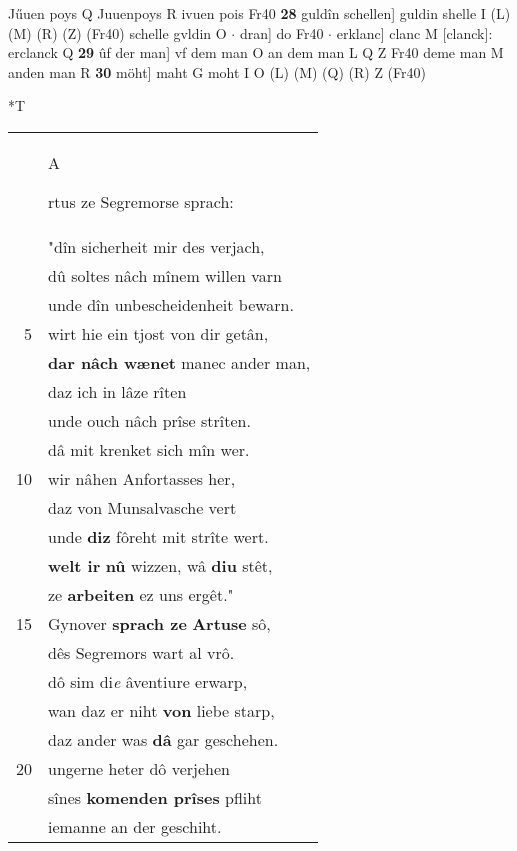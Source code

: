 \documentclass[8pt,a4paper,notitlepage]{article}
\begin{document}
\begin{table}[ht]
\begin{minipage}[t]{0.5\linewidth}
Jűuen poys Q Juuenpoys R ivuen pois Fr40 \textbf{28} guldîn schellen] guldin shelle I (L) (M) (R) (Z) (Fr40) schelle gvldin O  $\cdot$ dran] do Fr40  $\cdot$ erklanc] clanc M [clanck]: erclanck Q \textbf{29} ûf der man] vf dem man O an dem man L Q Z Fr40 deme man M anden man R \textbf{30} möht] maht G moht I O (L) (M) (Q) (R) Z (Fr40) \newline
\end{minipage}
\hspace{0.5cm}
\begin{minipage}[t]{0.5\linewidth}
\small
\begin{center}*T
\end{center}
\begin{tabular}{rl}
 & \begin{large}A\end{large}rtus ze Segremorse sprach:\\ 
 & "dîn sicherheit mir des verjach,\\ 
 & dû soltes nâch mînem willen varn\\ 
 & unde dîn unbescheidenheit bewarn.\\ 
5 & wirt hie ein tjost von dir getân,\\ 
 & \textbf{dar nâch wænet} manec ander man,\\ 
 & daz ich in lâze rîten\\ 
 & unde ouch nâch prîse strîten.\\ 
 & dâ mit krenket sich mîn wer.\\ 
10 & wir nâhen Anfortasses her,\\ 
 & daz von Munsalvasche vert\\ 
 & unde \textbf{diz} fôreht mit strîte wert.\\ 
 & \textbf{welt ir} \textbf{nû} wizzen, wâ \textbf{diu} stêt,\\ 
 & ze \textbf{arbeiten} ez uns ergêt."\\ 
15 & Gynover \textbf{sprach ze} \textbf{Artuse} sô,\\ 
 & dês Segremors wart al vrô.\\ 
 & dô sim di\textit{e} âventiure erwarp,\\ 
 & wan daz er niht \textbf{von} liebe starp,\\ 
 & daz ander was \textbf{dâ} gar geschehen.\\ 
20 & ungerne heter dô verjehen\\ 
 & sînes \textbf{komenden prîses} pfliht\\ 
 & iemanne an der geschiht.\\ 

\end{tabular}
\end{minipage}
\end{table}
\end{document}
